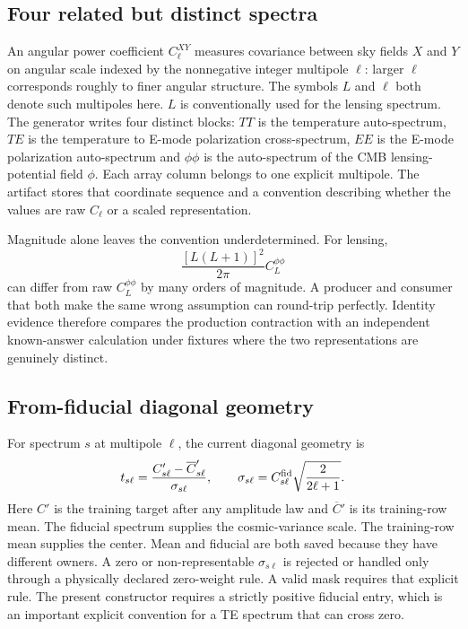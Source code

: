 \documentclass[10pt,aps,prd,twocolumn,nofootinbib]{revtex4-2}
\begin{document}
\subsection{Four related but distinct spectra}

An angular power coefficient $C_\ell^{XY}$ measures covariance between sky
fields $X$ and $Y$ on angular scale indexed by the nonnegative integer
multipole $\ell$: larger $\ell$ corresponds roughly to finer angular
structure.  The symbols $L$ and $\ell$ both denote such multipoles here. $L$
is conventionally used for the lensing spectrum.  The generator writes four
distinct blocks: $TT$ is the temperature auto-spectrum, $TE$ is the
temperature to E-mode polarization cross-spectrum, $EE$ is the E-mode
polarization auto-spectrum and $\phi\phi$ is the auto-spectrum of the CMB
lensing-potential field $\phi$.  Each array column belongs to one explicit
multipole.  The artifact stores that coordinate sequence and a convention
describing whether the values are raw \(C_\ell\) or a scaled representation.

Magnitude alone leaves the convention underdetermined.  For lensing,
\begin{equation*}
 \frac{[L(L+1)]^2}{2\pi}C_L^{\phi\phi}
\end{equation*}
can differ from raw \(C_L^{\phi\phi}\) by many orders of magnitude.  A producer
and consumer that both make the same wrong assumption can round-trip
perfectly.  Identity evidence therefore compares the production contraction
with an independent known-answer calculation under fixtures where the two
representations are genuinely distinct.

\subsection{From-fiducial diagonal geometry}

For spectrum \(s\) at multipole \(\ell\), the current diagonal geometry is
\begin{equation*}
  t_{s\ell}
  =\frac{C'_{s\ell}-\overline C'_{s\ell}}{\sigma_{s\ell}},
  \qquad
  \sigma_{s\ell}=C^{\rm fid}_{s\ell}
        \sqrt{\frac{2}{2\ell+1}}.
\end{equation*}
Here \(C'\) is the training target after any amplitude law and
\(\overline C'\) is its training-row mean.  The fiducial spectrum supplies the
cosmic-variance scale.  The training-row mean supplies the center.  Mean and fiducial are both saved
because they have different owners.  A zero or non-representable
\(\sigma_{s\ell}\) is rejected or handled only through a physically declared
zero-weight rule.  A valid mask requires that explicit rule.  The
present constructor requires a strictly positive fiducial entry, which is an
important explicit convention for a TE spectrum that can cross zero.
\end{document}
